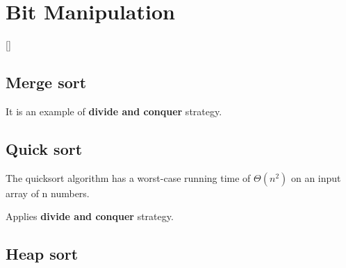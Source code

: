 \chapter{Bit Manipulation}

[\cite[See][- 2.3 Bit Manipulations]{LaaksonenGuideToCompetitiveProgramming}]

\section{Merge sort}

It is an example of \textbf{divide and conquer} strategy.

\section{Quick sort}
The quicksort algorithm has a worst-case running time of $\Theta(n^{2})$ on an input array of n numbers.

Applies \textbf{divide and conquer} strategy.

\section{Heap sort}